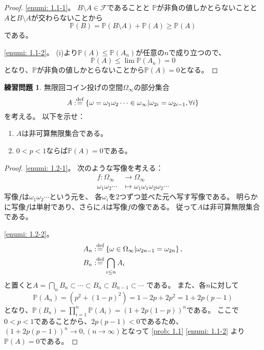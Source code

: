 \documentclass[uplatex]{jsarticle}
\theoremstyle{definition}
\newtheorem{prob}[prob]{練習問題}
\def\P{\mathbb{P}}
\def\mcF{\mathcal{F}}
\def\dfn{:\overset{\mbox{{\scriptsize def}}}{=}}
\begin{document}
\begin{proof}
  \ref{enumi: 1.1-1}。
  \(B\setminus A\in \mcF\)であることと
  \(\P\)が非負の値しかとらないことと
  \(A\)と\(B\setminus A\)が交わらないことから
  \[
  \P(B) = \P(B\setminus A) + \P(A)
  \geq \P(A)
  \]
  である。

  \ref{enumi: 1.1-2}。
  (i)より\(\P(A)\leq \P(A_n)\)が任意の\(n\)で成り立つので、
  \[
  \P(A) \leq \lim \P(A_n) = 0
  \]
  となり、\(\P\)が非負の値しかとらないことから\(\P(A)=0\)となる。
\end{proof}




\begin{prob}\label{prob: 1.2}
  無限回コイン投げの空間\(\Omega_{\infty}\)の部分集合
  \[
  A \dfn \left\{ \omega = \omega_1\omega_2\cdots \in \omega_{\infty} \middle|
  \omega_{2i}=\omega_{2i-1} , \forall i \right\}
  \]
  を考える。
  以下を示せ：
  \begin{enumerate}
    \item \label{enumi: 1.2-1}
    \(A\)は非可算無限集合である。
    \item \label{enumi: 1.2-2}
    \(0<p<1\)ならば\(\P(A)=0\)である。
  \end{enumerate}
\end{prob}

\begin{proof}
  \ref{enumi: 1.2-1}。
  次のような写像を考える：
  \begin{align*}
    f:\Omega_\infty &\to \Omega_{\infty} \\
    \omega_1\omega_2\cdots &\mapsto \omega_1\omega_1\omega_2\omega_2\cdots
  \end{align*}
  写像\(f\)は\(\omega_1\omega_2\cdots\)という元を、
  各\(\omega_i\)を\(2\)つずつ並べた元へ写す写像である。
  明らかに写像\(f\)は単射であり、さらに\(A\)は写像\(f\)の像である。
  従って\(A\)は非可算無限集合である。

  \ref{enumi: 1.2-2}。
  \begin{align*}
    A_n &\dfn
    \left\{ \omega \in \Omega_\infty \middle| \omega_{2n-1}=\omega_{2n}\right\}, \\
    B_n &\dfn \bigcap_{i\leq n}A_i
  \end{align*}
  と置くと\(A=\bigcap_n B_n\subset \cdots \subset B_n \subset B_{n-1}\subset \cdots \)
  である。
  また、各\(n\)に対して
  \[\P(A_n) = (p^2+(1-p)^2) = 1-2p+2p^2 = 1+2p(p-1)\]
  となり、\(\P(B_n) = \prod _{i=1}^n \P(A_i) = (1+2p(1-p))^n\)である。
  ここで\(0<p<1\)であることから、\(2p(p-1)<0\)であるため、
  \((1+2p(p-1))^n \to 0 , (n\to \infty)\)となって
  \autoref{prob: 1.1} \ref{enumi: 1.1-2}
  より\(\P(A)=0\)である。
\end{proof}
\end{document}
